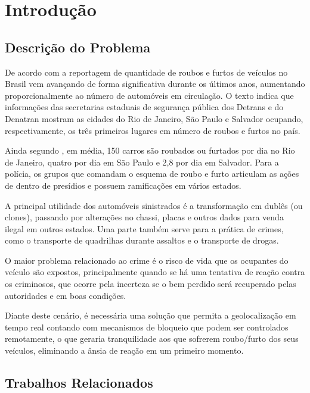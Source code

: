 \chapter {Introdu\c{c}\~{a}o}
\label{cap:introducao}

\section{Descri\c{c}\~{a}o do Problema}

De acordo com a reportagem de \textcite{borges:2011} quantidade de roubos e furtos de veículos no Brasil vem avançando de forma 
significativa durante os últimos anos, aumentando proporcionalmente ao número 
de automóveis em circulação. O texto indica que informações das secretarias estaduais de 
segurança pública dos Detrans e do Denatran mostram as cidades do Rio de Janeiro, São Paulo e Salvador ocupando, respectivamente, os três primeiros lugares em número de roubos e furtos no país.

Ainda segundo \textcite{borges:2011}, em média, 150 carros são 
roubados ou furtados por dia no Rio de Janeiro, quatro por dia em São Paulo e 
2,8 por dia em Salvador. Para a polícia, os grupos que comandam o esquema de
roubo e furto articulam as ações de dentro de presídios e possuem ramificações
em vários estados. 

A principal utilidade dos automóveis sinistrados é a transformação em dublês (ou clones), passando por alterações no chassi, placas e outros dados para venda ilegal em outros estados. Uma parte também serve para a prática de crimes, como o transporte de quadrilhas durante assaltos e o transporte de drogas.

O maior problema relacionado ao crime é o risco de vida que os ocupantes do veículo são expostos, principalmente quando se há uma tentativa de reação contra os criminosos, que ocorre pela incerteza se o bem perdido será recuperado pelas autoridades e em boas condições.

Diante deste cenário, é necessária uma solução que permita a geolocalização em tempo real contando com mecanismos de bloqueio que podem ser controlados remotamente, o que geraria tranquilidade aos que sofrerem roubo/furto dos seus veículos, eliminando a ânsia de reação em um primeiro momento.

\hfill

\section{Trabalhos Relacionados}	

